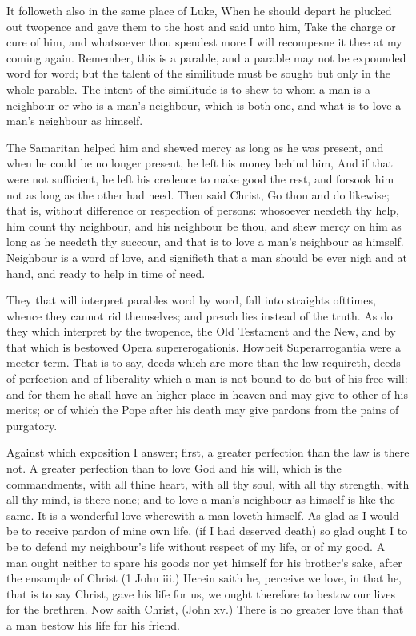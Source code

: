 It followeth also in the same place of Luke, When he 
should depart he plucked out twopence and gave them to 
the host and said unto him, Take the charge or cure of him, 
and whatsoever thou spendest more I will recompesne it 
thee at my coming again. Remember, this is a parable, and 
a parable may not be expounded word for word; but the talent
of the similitude must be sought but only in the whole parable.
The intent of the similitude is to shew to whom a man 
is a neighbour or who is a man's neighbour, which is both 
one, and what is to love a man's neighbour as himself. 

The Samaritan helped him and shewed mercy as long 
as he was present, and when he could be no longer 
present, he left his money behind him, And if that were not 
sufficient, he left his credence to make good the rest, and 
forsook him not as long as the other had need. Then said 
Christ, Go thou and do likewise; that is, without difference 
or respection of persons: whosoever needeth thy help, him 
count thy neighbour, and his neighbour be thou, and shew 
mercy on him as long as he needeth thy succour, and that 
is to love a man's neighbour as himself. Neighbour is a 
word of love, and signifieth that a man should be ever nigh 
and at hand, and ready to help in time of need. 

They that will interpret parables word by word, fall into 
straights ofttimes, whence they cannot rid themselves; and 
preach lies instead of the truth. As do they which interpret 
by the twopence, the Old Testament and the New, and by 
that which is bestowed Opera supererogationis. Howbeit 
Superarrogantia were a meeter term. That is to say, deeds 
which are more than the law requireth, deeds of perfection 
and of liberality which a man is not bound to do but of his 
free will: and for them he shall have an higher place in heaven
and may give to other of his merits; or of which the 
Pope after his death may give pardons from the pains 
of purgatory. 

Against which exposition I answer; first, a greater perfection
than the law is there not. A greater perfection 
than to love God and his will, which is the commandments, 
with all thine heart, with all thy soul, with all thy strength, 
with all thy mind, is there none; and to love a man's 
neighbour as himself is like the same. It is a wonderful 
love wherewith a man loveth himself. As glad as I would 
be to receive pardon of mine own life, (if I had deserved 
death) so glad ought I to be to defend my neighbour's life 
without respect of my life, or of my good. A man ought 
neither to spare his goods nor yet himself for his brother's 
sake, after the ensample of Christ (1 John iii.) Herein 
saith he, perceive we love, in that he, that is to say Christ, 
gave his life for us, we ought therefore to bestow our lives 
for the brethren. Now saith Christ, (John xv.) There is 
no greater love than that a man bestow his life for his friend. 

